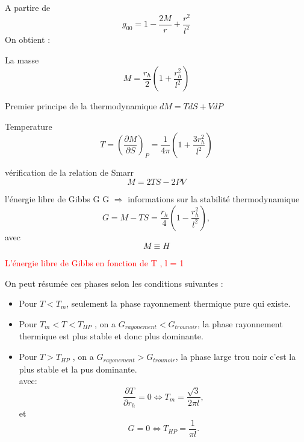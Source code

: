 \documentclass{beamer}
\begin{document}
\begin{frame}
	A partire de $$g_{00}=1-\dfrac{2M}{r}+\dfrac{r^{2}}{l^{2}}$$
	On obtient :
	\begin{block}{La masse}
	$$	M=\dfrac{r_{h}}{2}(1+\dfrac{r_{h}^{2}}{l^{2}})$$
		
	\end{block}
	\begin{block}{ Premier principe de la thermodynamique }
$	dM=TdS+VdP $
	
\end{block}
\begin{block}{ Temperature }
$$T=(\dfrac{\partial M}{\partial S})_{P}=\dfrac{1}{4\pi}(1+\dfrac{3r_{h}^{2}}{l^{2}})$$
	
\end{block}
	\begin{block}{vérification de la relation de Smarr}
		$$M=2TS-2PV$$
	
\end{block}
\end{frame}
\begin{frame}
\begin{block}{l'énergie libre de Gibbs G }
G $\Rightarrow$	informations sur la stabilité thermodynamique
$$G=M-TS=\dfrac{r_{h}}{4}(1-\dfrac{r_{h}^{2}}{l^{2}}),$$
avec $$M\equiv H$$
\end{block}
\textcolor{red}{L'énergie libre de Gibbs en fonction de T , l = 1}
\end{frame}
\begin{frame}
On peut résumée ces phases selon les conditions suivantes :
	
\begin{itemize}
	\item  Pour $ T < T_{m}$, seulement la phase rayonnement thermique pure qui existe.
	
	\item Pour $T_{m} < T < T_{HP}$ , on a $G_{rayonement} < G_{trounoir}$, la phase rayonnement thermique est
	plus stable et donc plus dominante.
	
	\item Pour $T > T_{HP}$ , on a $G_{rayonement} > G_{trounoir}$, la phase large trou noir c'est la plus stable et la pus dominante.\\
	avec:
	$$\dfrac{\partial T}{\partial r_{h}}=0 \Leftrightarrow T_{m}=\dfrac{\sqrt{3}}{2\pi l},$$
	et
	$$G=0 \Leftrightarrow T_{HP}=\dfrac{1}{\pi l}.$$
	
	
\end{itemize}

\end{frame}
\end{document}
